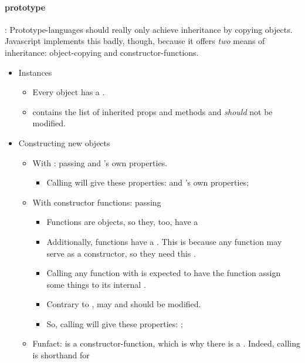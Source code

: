 \paragraph{prototype}: Prototype-languages should really only achieve inheritance by copying objects. Javascript implements this badly, though, because it offers \emph{two} means of inheritance: object-copying and constructor-functions.
\begin{itemize}
    \item Instances 
        \begin{itemize}
            \item Every object has a . 
            \item {} contains the list of inherited props and methods and \emph{should} not be modified.
        \end{itemize}
    \item Constructing new objects
        \begin{itemize}
            \item With : passing  and 's own properties.
                \begin{itemize}
                    \item Calling  will give  these properties:  and 's own properties;
                \end{itemize}
            \item With constructor functions: passing 
                \begin{itemize}
                    \item Functions are objects, so they, too, have a 
                    \item Additionally, functions have a . This is because any function may serve as a constructor, so they need this .
                    \item Calling any function with  is expected to have the function assign some things to its internal .
                    \item Contrary to ,  may and should be modified.
                    \item So, calling  will give  these properties: ;
                \end{itemize}
            \item Funfact:  is a constructor-function, which is why there is a . Indeed, calling  is shorthand for  
        \end{itemize}
\end{itemize}

